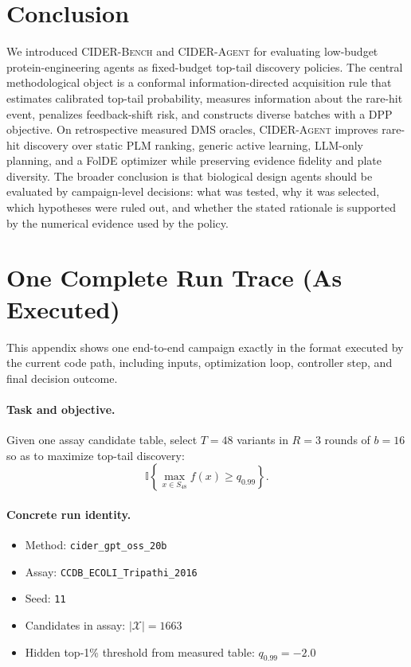 \documentclass{article}
\newcommand{\bench}{\textsc{CIDER-Bench}}
\newcommand{\agent}{\textsc{CIDER-Agent}}
\newcommand{\dms}{DMS}
\newcommand{\xset}{\mathcal X}
\newcommand{\I}{\mathbb I}
\begin{document}
\section{Conclusion}
\label{sec:conclusion}

We introduced \bench{} and \agent{} for evaluating low-budget protein-engineering agents as fixed-budget top-tail discovery policies. The central methodological object is a conformal information-directed acquisition rule that estimates calibrated top-tail probability, measures information about the rare-hit event, penalizes feedback-shift risk, and constructs diverse batches with a DPP objective. On retrospective measured \dms{} oracles, \agent{} improves rare-hit discovery over static PLM ranking, generic active learning, LLM-only planning, and a FolDE optimizer while preserving evidence fidelity and plate diversity. The broader conclusion is that biological design agents should be evaluated by campaign-level decisions: what was tested, why it was selected, which hypotheses were ruled out, and whether the stated rationale is supported by the numerical evidence used by the policy.

\iffalse
\appendix
\section{One Complete Run Trace (As Executed)}
\label{app:runtrace}

This appendix shows one end-to-end campaign exactly in the format executed by the current code path, including inputs, optimization loop, controller step, and final decision outcome.

\paragraph{Task and objective.}
Given one assay candidate table, select $T=48$ variants in $R=3$ rounds of $b=16$ so as to maximize top-tail discovery:
\[
\I\!\left\{\max_{x\in S_{48}} f(x)\ge q_{0.99}\right\}.
\]

\paragraph{Concrete run identity.}
\begin{itemize}
\item Method: \texttt{cider\_gpt\_oss\_20b}
\item Assay: \texttt{CCDB\_ECOLI\_Tripathi\_2016}
\item Seed: \texttt{11}
\item Candidates in assay: $|\xset|=1663$
\item Hidden top-1\% threshold from measured table: $q_{0.99}=-2.0$
\end{itemize}
\end{document}
